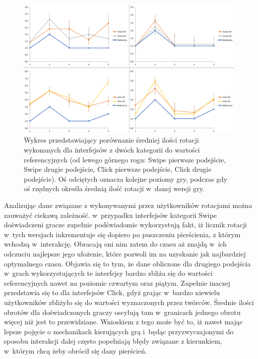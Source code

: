 \documentclass[a4paper,12pt,numbers=noenddot]{report}
\begin{document}
\begin{figure}[h!]
	\centering
  	\includegraphics[width=\linewidth]{diag/ref_rotations.png}
	\caption{Wykres przedstawiający porównanie średniej ilości rotacji wykonanych dla interfejsów z dwóch kategorii do wartości referencyjnych (od lewego górnego rogu: Swipe pierwsze podejście, Swipe drugie podejście, Click pierwsze podejście, Click drugie podejście). Oś odciętych oznacza kolejne poziomy gry, podczas gdy oś rzędnych określa średnią ilość rotacji w~danej wersji gry.}
	\label{fig:ref:rotations}
\end{figure}

Analizując dane związane z wykonywanymi przez użytkowników rotacjami można zauważyć ciekawą zależność. w~przypadku interfejsów kategorii Swipe doświadczeni gracze zupełnie podświadomie wykorzystują fakt, iż licznik rotacji w~tych wersjach inkrementuje się dopiero po puszczeniu pierścienia, z którym wchodzą w~interakcję. Obracają oni nim zatem do czasu aż znajdą w~ich odczuciu najlepsze jego ułożenie, które pozwoli im na uzyskanie jak najbardziej optymalnego czasu. Objawia się to tym, że dane obliczone dla drugiego podejścia w~grach wykorzystujących te interfejsy bardzo zbliża się do wartości referencyjnych nawet na poziomie czwartym oraz piątym. Zupełnie inaczej przedstawia się to dla interfejsów Click, gdyż grając w~bardzo niewielu użytkowników zbliżyło się do wartości wyznaczonych przez twórców. Średnie ilości obrotów dla doświadczonych graczy oscylują tam w~granicach jednego obrotu więcej niż jest to przewidziane. Wnioskiem z tego może być to, iż nawet mając lepsze pojęcie o mechanikach kierujących grą i~będąc przyzwyczajonymi do sposobu interakcji dalej często popełniają błędy związane z kierunkiem, w~którym chcą żeby obrócił się dany pierścień.
\end{document}
